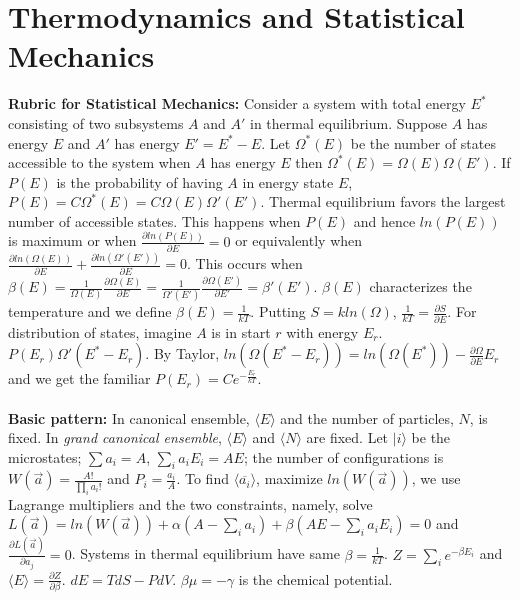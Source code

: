 \section{Thermodynamics and Statistical Mechanics}
{\bf Rubric for Statistical Mechanics:}  Consider a system with total energy 
$E^*$ consisting of two subsystems $A$ and $A'$ in thermal
equilibrium.  Suppose $A$ has energy $E$ and $A'$ has energy $E'= E^*-E$.  
Let $\Omega^*(E)$ be the number of
states accessible to the system when $A$ has energy $E$ then
$\Omega^*(E)= \Omega(E) \Omega(E')$.  If $P(E)$ is the probability of having $A$ in energy state $E$,
$P(E)= C \Omega^*(E)= C \Omega(E) \Omega'(E')$.  Thermal equilibrium favors the
largest number of accessible
states.  This happens when $P(E)$ and hence $ln(P(E))$ is maximum or when
${\frac {\partial ln(P(E))} {\partial E}} = 0$ or equivalently when
$ {\frac {\partial {ln(\Omega(E))}} {\partial E}}+
{\frac {\partial {ln(\Omega'(E'))}} {\partial E}}= 0$.  This occurs when
$\beta(E)= {\frac 1 {\Omega(E)}} {\frac {\partial {\Omega(E)}} {\partial E}}=
{\frac 1 {\Omega'(E')}} {\frac {\partial {\Omega(E')}} {\partial E'}}= \beta'(E')$.
$\beta(E)$ characterizes the temperature and we define $\beta(E)= {\frac 1 {kT}}$.  Putting $S= k ln(\Omega)$,
${\frac 1 {kT}}= {\frac {\partial S} {\partial E}}$.  For distribution of states, imagine
$A$ is in start $r$ with energy $E_r$.  $P(E_r) 
\Omega'(E^*-E_r)$.  By Taylor, $ln(\Omega(E^* - E_r))= ln(\Omega(E^*))- {\frac {\partial \Omega} {\partial E}} E_r$
and we get the familiar $P(E_r)= C e^{- {\frac {E_r} {kT}}}$.
\\
\\
{\bf Basic pattern:}
In canonical ensemble, $\langle E \rangle$ and the number of particles, $N$, is fixed.
In \emph{grand canonical ensemble}, $\langle E \rangle$ and $\langle N \rangle$ are fixed.
Let $| i \rangle$ be the microstates; $\sum a_i = A$, $\sum_i a_i E_i = AE$; the number
of configurations is 
$W({\vec a})= {\frac {A!} {\prod_i a_i!}}$ and $P_i= {\frac {a_i} A}$.  To find
$\langle {\overline {a_i}} \rangle$, maximize $ln(W({\vec a}))$, we use Lagrange 
multipliers and the two constraints, namely, solve
$L({\vec a})= ln(W({\vec a})) + \alpha (A- \sum_i a_i) + \beta (AE- \sum_i a_i E_i)= 0$
and ${\frac {\partial L({\vec a})} {\partial a_j}} =0$.  
Systems in thermal equilibrium have same $\beta= {\frac 1 {kT}}$.  
$Z= \sum_i e^{-\beta E_i}$ and
$\langle E \rangle = {\frac {\partial Z}{\partial \beta}}$.  
$dE= TdS - P dV$.  $\beta \mu= - \gamma$ is the
chemical potential.  
\\
